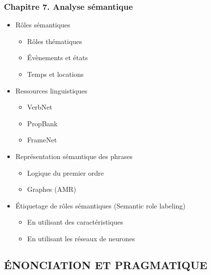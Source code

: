 \documentclass[11pt, a4paper]{article}
\begin{document}
\begin{tcolorbox}
\subsubsection*{Chapitre 7. Analyse sémantique}

\begin{multicols}{2}
	\begin{itemize}
		
		\item Rôles sémantiques
		\begin{itemize}
			\item Rôles thématiques
			\item Évènements et états 
			\item Temps et locations	
		\end{itemize}
	
		\item Ressources linguistiques
		\begin{itemize}
			\item VerbNet
			\item PropBank
			\item FrameNet	
		\end{itemize}
		
		\item Représentation sémantique des phrases
		\begin{itemize}
			\item Logique du premier ordre
			\item Graphes (AMR)
		\end{itemize}
	
		\item Étiquetage de rôles sémantiques (Semantic role labeling)
		\begin{itemize}
			\item En utilisant des caractéristiques
			\item En utilisant les réseaux de neurones
		\end{itemize}
		
	\end{itemize}
\end{multicols}
\end{tcolorbox}

\subsection*{\uppercase{Énonciation et pragmatique}}
\end{document}
